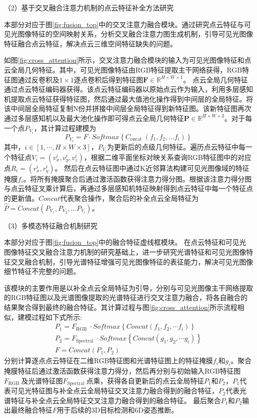 \documentclass[12pt]{article}
\begin{document}
（2）基于交叉融合注意力机制的点云特征补全方法研究

本部分对应于图\ref{fig:fusion_top}中的交叉注意力融合模块。通过研究点云特征与可见光图像特征的空间映射关系，分析交叉融合注意力图生成机制，引导可见光图像特征融合点云特征，解决点云三维空间特征缺失的问题。

如图\ref{fig:cross_attention}所示，交叉注意力融合模块的输入为可见光图像特征和点云全局几何特征。其中，可见光图像特征由RGB特征提取主干网络获得，RGB特征图通过反卷积及$1 \times 1$逐点卷积后得到特征图$\mathbf{F} \in \mathbb{R}^{H \times W \times 1}$。
点云全局几何特征通过点云特征编码器获得。该点云特征编码器以原始点云作为输入，利用多层感知机提取点云特征获得特征图，然后通过最大值池化操作得到中间层的全局特征。将该中间层全局特征复制N份并拼接中间层全局特征得到新特征图。该新特征图再次通过多层感知机以及最大池化操作即可得点云全局几何特征$\mathbf{P} \in \mathbb{R}^{H \times W \times 3}$。对于每一个点$P_{V_i}$，其计算过程建模为
\begin{equation}
    P_{V_i}=F \cdot Softmax\left\{C_{\text {oncat }}\left(f_{1}, f_{2}, \ldots f_{i}\right)\right\}
    \label{eq:point_cloud_cross}
\end{equation}
其中，$i \in[1, \cdots, H \times W \times 3]$，$P_{V_i}$为更新后的点级几何特征。遍历点云特征中每一个特征点$V_{i}=\left(v_{x}^{i}, v_{y}^{i}, v_{z}^{i}\right)$，根据二维平面坐标对映关系查询RGB特征图中的对应点$R_{i}=\left(r_{x}^{i}, r_{y}^{i}\right)$。
然后在点云特征图中通过K近邻算法构建可见光图像域的特征掩膜$f_{i}$。将所有掩膜聚合后通过激活函数获得注意力得分图。根据该注意力得分图与点云特征叉乘计算后，再通过多层感知机特征映射得到点云特征中每一个特征点的更新值。$Concat$代表聚合操作，聚合后的补全点云全局特征为$\hat{P} = Concat\left( P_{V_1},P_{V_2}, \ldots  P_{V_i}\right)$。

（3）多模态特征融合机制研究

本部分对应于图\ref{fig:fusion_top}中的融合特征虚线框模块。
在点云特征和可见光图像特征交叉融合注意力机制的研究基础上，进一步研究光谱特征和可见光图像特征交叉融合机制，引导光谱特征增强可见光图像特征的表征能力，解决可见光图像细节特征不完整的问题。

该模块的主要作用是以补全点云全局特征为引导，分别与可见光图像主干网络提取的RGB特征图以及光谱图像提取的光谱特征进行交叉注意力融合，将各自融合的结果聚合得到最终的融合特征。其计算过程与图\ref{fig:cross_attention}所示流程相似，建模过程如下式所示:
\begin{gather}
    P_{1}=F_{\text {RGB }} \cdot Softmax\left\{Concat\left(f_{1}, f_{2}, \cdots f_{i}\right)\right\} \\
    P_{2}=F_{\text {Spectral }} \cdot Softmax\left\{Concat\left(g_1, g_2, \cdots g_i\right)\right\}    \\
    F=Concat\left(P_{1}, P_{2}\right)    
\end{gather}
分别计算逐点点云特征在二维RGB特征图和光谱特征图上的特征掩膜$f_i$和$g_i$。聚合掩膜特征后通过激活函数获得注意力得分，然后再分别与初始输入RGB特征图$F_{\text {RGB }}$及光谱特征图$F_{\text {Spectral }}$点乘，获得各自更新后的点云全局特征$P_{1}$和$P_{2}$，$P_{1}$代表可见光特征图与补全点云全局特征交叉注意力融合得到的融合特征，$P_{2}$代表光谱特征与补全点云全局特征交叉注意力融合得到的融合特征。
最后聚合$P_{1}$和$P_{2}$输出最终融合特征$F$用于后续的3D目标检测和6D姿态推断。
\end{document}
